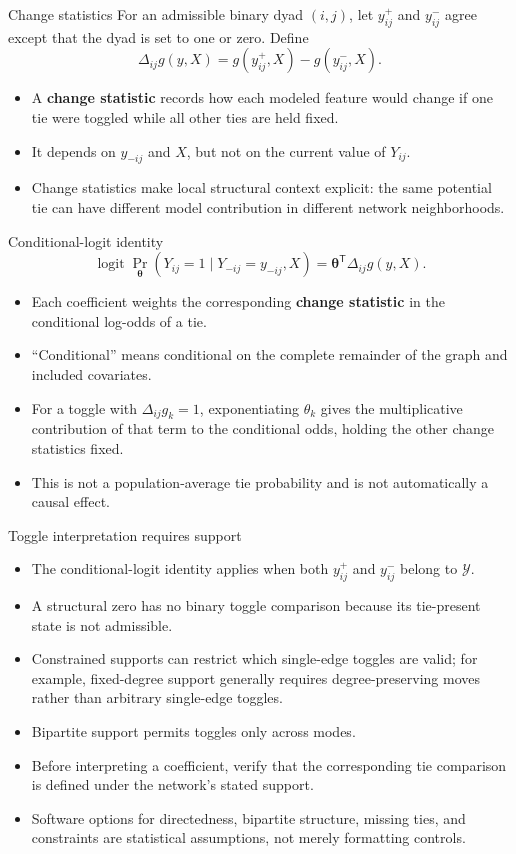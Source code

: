 \documentclass[aspectratio=169,11pt]{beamer}
\newcommand{\term}[1]{\textbf{\color{nupurple}#1}}
\newcommand{\logit}{\operatorname{logit}}
\begin{document}
\begin{frame}{Change statistics}
For an admissible binary dyad $(i,j)$, let $y^+_{ij}$ and $y^-_{ij}$ agree except that the dyad is set to one or zero. Define
\[
\Delta_{ij}g(y,X)=g(y^+_{ij},X)-g(y^-_{ij},X).
\]
\begin{itemize}
\item A \term{change statistic} records how each modeled feature would change if one tie were toggled while all other ties are held fixed.
\item It depends on $y_{-ij}$ and $X$, but not on the current value of $Y_{ij}$.
\item Change statistics make local structural context explicit: the same potential tie can have different model contribution in different network neighborhoods.
\end{itemize}
\end{frame}

\begin{frame}{Conditional-logit identity}
\[
\logit\Pr_{\boldsymbol\theta}(Y_{ij}=1\mid Y_{-ij}=y_{-ij},X)
=\boldsymbol\theta^{\mathsf T}\Delta_{ij}g(y,X).
\]
\begin{itemize}
\item Each coefficient weights the corresponding \term{change statistic} in the conditional log-odds of a tie.
\item ``Conditional'' means conditional on the complete remainder of the graph and included covariates.
\item For a toggle with $\Delta_{ij}g_k=1$, exponentiating $\theta_k$ gives the multiplicative contribution of that term to the conditional odds, holding the other change statistics fixed.
\item This is not a population-average tie probability and is not automatically a causal effect.
\end{itemize}
\end{frame}

\begin{frame}{Toggle interpretation requires support}
\begin{itemize}
\item The conditional-logit identity applies when both $y^+_{ij}$ and $y^-_{ij}$ belong to $\mathcal{Y}$.
\item A structural zero has no binary toggle comparison because its tie-present state is not admissible.
\item Constrained supports can restrict which single-edge toggles are valid; for example, fixed-degree support generally requires degree-preserving moves rather than arbitrary single-edge toggles.
\item Bipartite support permits toggles only across modes.
\item Before interpreting a coefficient, verify that the corresponding tie comparison is defined under the network's stated support.
\item Software options for directedness, bipartite structure, missing ties, and constraints are statistical assumptions, not merely formatting controls.
\end{itemize}
\end{frame}
\end{document}
